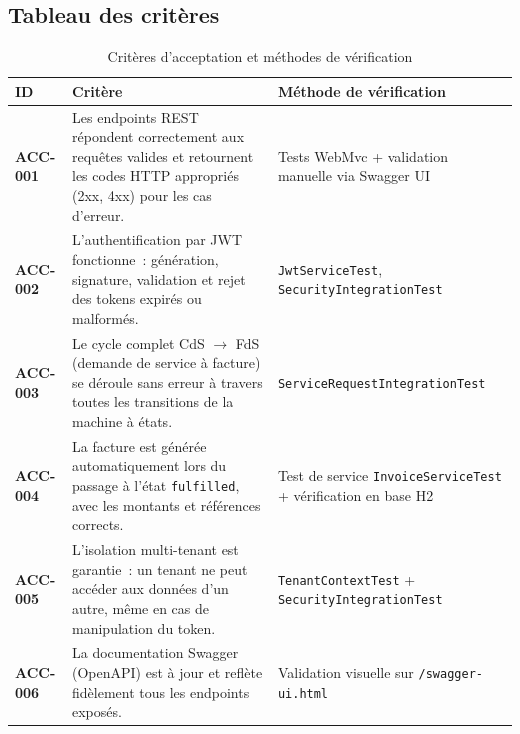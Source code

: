 \subsection{Tableau des critères}
\label{subsec:criteres-tableau}

\begin{table}[ht]
  \centering
  \caption{Critères d'acceptation et méthodes de vérification}
  \label{tab:criteres-acceptation}
  \renewcommand{\arraystretch}{1.4}
  \begin{tabularx}{\textwidth}{>{\bfseries}p{1.8cm}
                               >{\raggedright\arraybackslash}X
                               >{\raggedright\arraybackslash}p{4.2cm}}
    \toprule
    \textbf{ID} & \textbf{Critère} & \textbf{Méthode de vérification} \\
    \midrule
    ACC-001 & Les endpoints REST répondent correctement aux requêtes valides et retournent
              les codes HTTP appropriés (2xx, 4xx) pour les cas d'erreur.
            & Tests WebMvc + validation manuelle via Swagger UI \\
    ACC-002 & L'authentification par JWT fonctionne~: génération, signature, validation et
              rejet des tokens expirés ou malformés.
            & \texttt{JwtServiceTest}, \texttt{SecurityIntegrationTest} \\
    ACC-003 & Le cycle complet CdS $\rightarrow$ FdS (demande de service à facture) se
              déroule sans erreur à travers toutes les transitions de la machine à états.
            & \texttt{ServiceRequestIntegrationTest} \\
    ACC-004 & La facture est générée automatiquement lors du passage à l'état
              \texttt{fulfilled}, avec les montants et références corrects.
            & Test de service \texttt{InvoiceServiceTest} + vérification en base H2 \\
    ACC-005 & L'isolation multi-tenant est garantie~: un tenant ne peut accéder aux données
              d'un autre, même en cas de manipulation du token.
            & \texttt{TenantContextTest} + \texttt{SecurityIntegrationTest} \\
    ACC-006 & La documentation Swagger (OpenAPI) est à jour et reflète fidèlement tous les
              endpoints exposés.
            & Validation visuelle sur \texttt{/swagger-ui.html} \\
    \bottomrule
  \end{tabularx}
\end{table}

